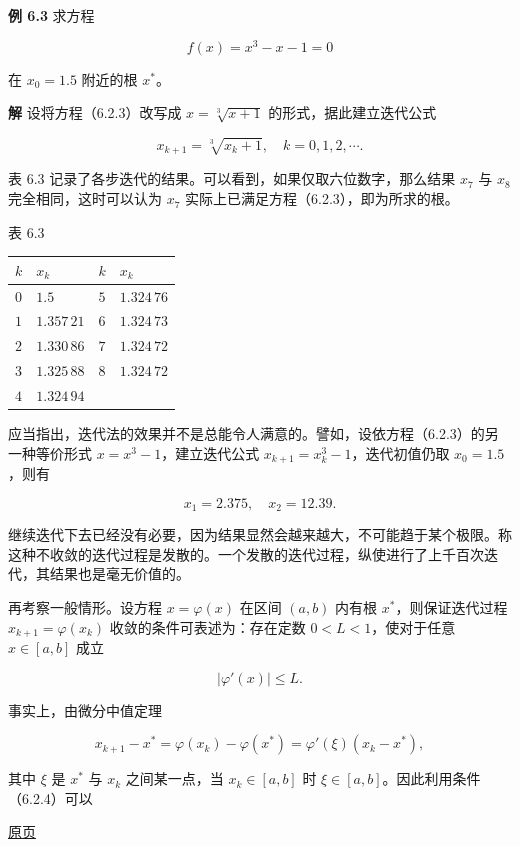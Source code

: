 \documentclass[
  10pt,
  fontset=fandol]{ctexart}
\newcounter{none} %
\begin{document}
\textbf{例 6.3} 求方程

\[
f(x)=x^3-x-1=0
\tag{6.2.3}
\]

在 \(x_0=1.5\) 附近的根 \(x^*\)。

\textbf{解} 设将方程（6.2.3）改写成 \(x=\sqrt[3]{x+1}\) 的形式，据此建立迭代公式

\[
x_{k+1}=\sqrt[3]{x_k+1},\quad k=0,1,2,\cdots.
\]

表 6.3 记录了各步迭代的结果。可以看到，如果仅取六位数字，那么结果 \(x_7\) 与 \(x_8\) 完全相同，这时可以认为 \(x_7\) 实际上已满足方程（6.2.3），即为所求的根。

表 6.3

{\def\LTcaptype{none} %
\begin{longtable}[]{@{}llll@{}}
\toprule\noalign{}
\(k\) & \(x_k\) & \(k\) & \(x_k\) \\
\midrule\noalign{}
\endhead
\bottomrule\noalign{}
\endlastfoot
\(0\) & \(1.5\) & \(5\) & \(1.324\,76\) \\
\(1\) & \(1.357\,21\) & \(6\) & \(1.324\,73\) \\
\(2\) & \(1.330\,86\) & \(7\) & \(1.324\,72\) \\
\(3\) & \(1.325\,88\) & \(8\) & \(1.324\,72\) \\
\(4\) & \(1.324\,94\) & & \\
\end{longtable}
}

应当指出，迭代法的效果并不是总能令人满意的。譬如，设依方程（6.2.3）的另一种等价形式 \(x=x^3-1\)，建立迭代公式 \(x_{k+1}=x_k^3-1\)，迭代初值仍取 \(x_0=1.5\)，则有

\[
x_1=2.375,\quad x_2=12.39.
\]

继续迭代下去已经没有必要，因为结果显然会越来越大，不可能趋于某个极限。称这种不收敛的迭代过程是发散的。一个发散的迭代过程，纵使进行了上千百次迭代，其结果也是毫无价值的。

再考察一般情形。设方程 \(x=\varphi(x)\) 在区间 \((a,b)\) 内有根 \(x^*\)，则保证迭代过程 \(x_{k+1}=\varphi(x_k)\) 收敛的条件可表述为：存在定数 \(0<L<1\)，使对于任意 \(x\in[a,b]\) 成立

\[
|\varphi'(x)|\leqslant L.
\tag{6.2.4}
\]

事实上，由微分中值定理

\[
x_{k+1}-x^*=\varphi(x_k)-\varphi(x^*)=\varphi'(\xi)(x_k-x^*),
\]

其中 \(\xi\) 是 \(x^*\) 与 \(x_k\) 之间某一点，当 \(x_k\in[a,b]\) 时 \(\xi\in[a,b]\)。因此利用条件（6.2.4）可以

\href{../../source-images/pdf-159.jpeg}{原页}
\end{document}
